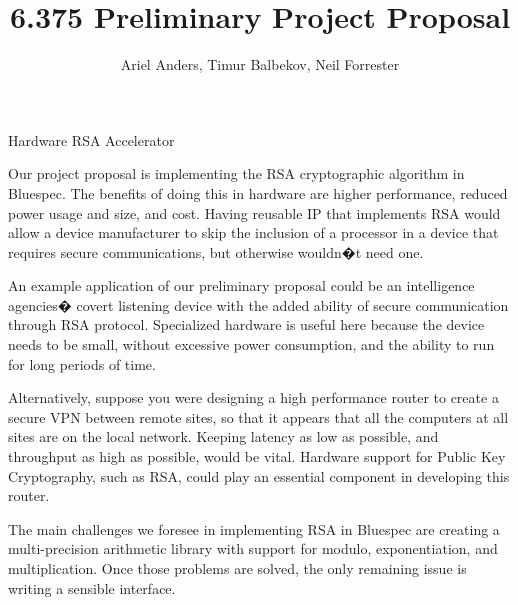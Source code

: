 \documentclass[12pt]{article}
\title{6.375 Preliminary Project Proposal}
\author{Ariel Anders, Timur Balbekov, Neil Forrester}
\begin{document}
\maketitle
\begin{center}
Hardware RSA Accelerator
\end{center}

Our project proposal is implementing the RSA cryptographic algorithm in Bluespec. The benefits of doing this in hardware are higher performance, reduced power usage and size, and cost. Having reusable IP that implements RSA would allow a device manufacturer to skip the inclusion of a processor in a device that requires secure communications, but otherwise wouldn�t need one. 

An example application of our preliminary proposal could be an intelligence agencies� covert listening device with the added ability of secure communication through RSA protocol.  Specialized hardware is useful here because the device needs to be small, without excessive power consumption, and the ability to run for long periods of time. 

Alternatively, suppose you were designing a high performance router to create a secure VPN between remote sites, so that it appears that all the computers at all sites are on the local network. Keeping latency as low as possible, and throughput as high as possible, would be vital. Hardware support for Public Key Cryptography, such as RSA, could play an essential component in developing this router.

The main challenges we foresee in implementing RSA in Bluespec are creating a  multi-precision arithmetic library with support for modulo, exponentiation, and multiplication.  Once those problems are solved, the only remaining issue is writing a sensible interface.
\end{document}
